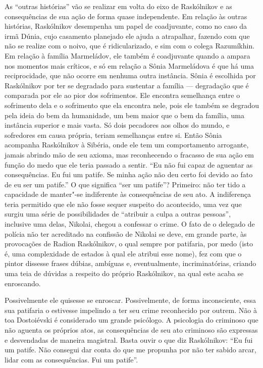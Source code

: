 As ``outras histórias'' vão se realizar em volta do eixo de Raskólnikov
e as consequências de sua ação de forma quase
independente. Em relação às outras histórias, Raskólnikov desempenha um
papel de coadjuvante, como no caso da irmã Dúnia, cujo casamento
planejado ele ajuda a atrapalhar, fazendo com que não se realize com o
noivo, que é ridicularizado, e sim com o colega Razumíkhin. Em relação à
família Marmeládov, ele também é coadjuvante quando a ampara nos
momentos mais críticos, e só em relação a Sônia Marmeládova é que há uma
reciprocidade, que não ocorre em nenhuma outra instância. Sônia é
escolhida por Raskólnikov por ter se degradado para sustentar a família
--- degradação que é comparada por ele ao pior dos sofrimentos. Ele
encontra semelhança entre o sofrimento dela e o sofrimento que ela
encontra nele, pois ele também se degradou pela ideia do bem da
humanidade, um bem maior que o bem da família, uma instância superior e
mais vasta. Só dois pecadores aos olhos do mundo, e sofredores em causa
própria, teriam semelhanças entre si. Então Sônia acompanha Raskólnikov
à Sibéria, onde ele tem um comportamento arrogante, jamais abrindo mão
de seu axioma, mas reconhecendo o fracasso de sua ação em função do
medo que ele teria passado a sentir. ``Eu não fui capaz de aguentar as
consequências. Eu fui um patife. Se minha ação não deu certo foi devido
ao fato de eu ser um patife.'' O que significa ``ser um patife''?
Primeiro: não ter tido a capacidade de manter"-se indiferente às
consequências de seu ato. A indiferença teria permitido que ele não
fosse sequer suspeito do acontecido, uma vez que surgiu uma série de
possibilidades de ``atribuir a culpa a outras pessoas'', inclusive uma
delas, Nikolai, chegou a confessar o crime. O fato de o delegado de
polícia não ter acreditado na confissão de Nikolai se deve, em grande
parte, às provocações de Radion Raskólnikov, o qual sempre por
patifaria, por medo (isto é, uma complexidade de estados à qual ele
atribui esse nome), fez com que o pintor dissesse frases dúbias,
ambíguas e, eventualmente, incriminatórias, criando uma teia de dúvidas
a respeito do próprio Raskólnikov, na qual este acaba se enroscando.

Possivelmente ele quisesse se enroscar. Possivelmente, de forma
inconsciente, essa sua patifaria o estivesse impelindo a ter seu crime
reconhecido por outrem. Não à toa Dostoiévski é considerado um grande
psicólogo. A psicologia do criminoso que não aguenta os próprios atos,
as consequências de seu ato criminoso são expressas e desvendadas de
maneira magistral. Basta ouvir o que diz Raskólnikov: ``Eu fui um
patife. Não consegui dar conta do que me propunha por não ter sabido
arcar, lidar com as consequências. Fui um patife''.

